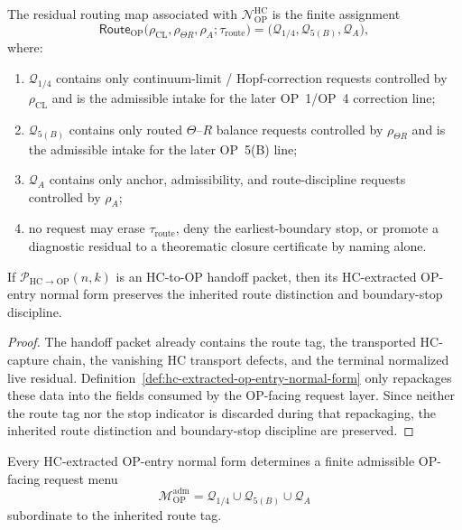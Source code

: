 \begin{definition}
\label{def:residual-routing-out-of-op-entry-normal-form}
The residual routing map associated with $\mathcal N_{\mathrm{OP}}^{\mathrm{HC}}$ is the finite assignment
\[
 \mathsf{Route}_{\mathrm{OP}}
 \bigl(\rho_{\mathrm{CL}},\rho_{\Theta R},\rho_A;\tau_{\mathrm{route}}\bigr)
 =
 \bigl(
 \mathcal Q_{1/4},
 \mathcal Q_{5(B)},
 \mathcal Q_A
 \bigr),
\]
where:
\begin{enumerate}[leftmargin=2em,label=(\alph*)]
 \item $\mathcal Q_{1/4}$ contains only continuum-limit / Hopf-correction requests controlled by $\rho_{\mathrm{CL}}$ and is the admissible intake for the later OP~1/OP~4 correction line;
 \item $\mathcal Q_{5(B)}$ contains only routed $\Theta$--$R$ balance requests controlled by $\rho_{\Theta R}$ and is the admissible intake for the later OP~5(B) line;
 \item $\mathcal Q_A$ contains only anchor, admissibility, and route-discipline requests controlled by $\rho_A$;
 \item no request may erase $\tau_{\mathrm{route}}$, deny the earliest-boundary stop, or promote a diagnostic residual to a theorematic closure certificate by naming alone.
\end{enumerate}
\end{definition}

\begin{lemma}
\label{lem:normal-form-extraction-preserves-route-discipline}
If $\mathcal P_{\mathrm{HC}\to\mathrm{OP}}(n,k)$ is an HC-to-OP handoff packet, then its HC-extracted OP-entry normal form preserves the inherited route distinction and boundary-stop discipline.
\end{lemma}

\begin{proof}
The handoff packet already contains the route tag, the transported HC-capture chain, the vanishing HC transport defects, and the terminal normalized live residual. Definition~\ref{def:hc-extracted-op-entry-normal-form} only repackages these data into the fields consumed by the OP-facing request layer. Since neither the route tag nor the stop indicator is discarded during that repackaging, the inherited route distinction and boundary-stop discipline are preserved.
\end{proof}

\begin{proposition}
\label{prop:finite-op-facing-request-menu-from-hc-handoff}
Every HC-extracted OP-entry normal form determines a finite admissible OP-facing request menu
\[
 \mathcal M_{\mathrm{OP}}^{\mathrm{adm}}
 =
 \mathcal Q_{1/4}\cup \mathcal Q_{5(B)}\cup \mathcal Q_A
\]
subordinate to the inherited route tag.
\end{proposition}

